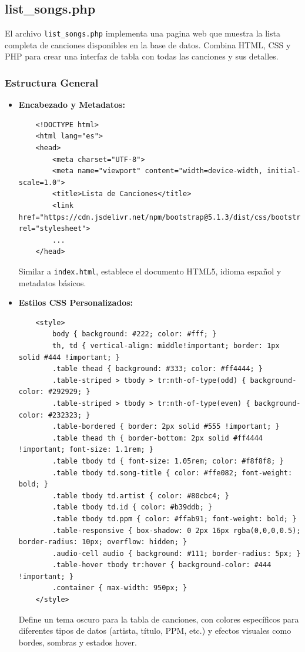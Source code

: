 \documentclass[a4paper,12pt]{article}
\begin{document}
\subsection{list\_songs.php}
El archivo \texttt{list\_songs.php} implementa una pagina web que muestra la lista completa de canciones disponibles en la base de datos. Combina HTML, CSS y PHP para crear una interfaz de tabla con todas las canciones y sus detalles.

\subsubsection{Estructura General}
\begin{itemize}
    \item \textbf{Encabezado y Metadatos:}
    \begin{verbatim}
    <!DOCTYPE html>
    <html lang="es">
    <head>
        <meta charset="UTF-8">
        <meta name="viewport" content="width=device-width, initial-scale=1.0">
        <title>Lista de Canciones</title>
        <link href="https://cdn.jsdelivr.net/npm/bootstrap@5.1.3/dist/css/bootstrap.min.css" rel="stylesheet">
        ...
    </head>
    \end{verbatim}
    Similar a \texttt{index.html}, establece el documento HTML5, idioma español y metadatos básicos.

    \item \textbf{Estilos CSS Personalizados:}
    \begin{verbatim}
    <style>
        body { background: #222; color: #fff; }
        th, td { vertical-align: middle!important; border: 1px solid #444 !important; }
        .table thead { background: #333; color: #ff4444; }
        .table-striped > tbody > tr:nth-of-type(odd) { background-color: #292929; }
        .table-striped > tbody > tr:nth-of-type(even) { background-color: #232323; }
        .table-bordered { border: 2px solid #555 !important; }
        .table thead th { border-bottom: 2px solid #ff4444 !important; font-size: 1.1rem; }
        .table tbody td { font-size: 1.05rem; color: #f8f8f8; }
        .table tbody td.song-title { color: #ffe082; font-weight: bold; }
        .table tbody td.artist { color: #80cbc4; }
        .table tbody td.id { color: #b39ddb; }
        .table tbody td.ppm { color: #ffab91; font-weight: bold; }
        .table-responsive { box-shadow: 0 2px 16px rgba(0,0,0,0.5); border-radius: 10px; overflow: hidden; }
        .audio-cell audio { background: #111; border-radius: 5px; }
        .table-hover tbody tr:hover { background-color: #444 !important; }
        .container { max-width: 950px; }
    </style>
    \end{verbatim}
    Define un tema oscuro para la tabla de canciones, con colores específicos para diferentes tipos de datos (artista, título, PPM, etc.) y efectos visuales como bordes, sombras y estados hover.
\end{itemize}
\end{document}
